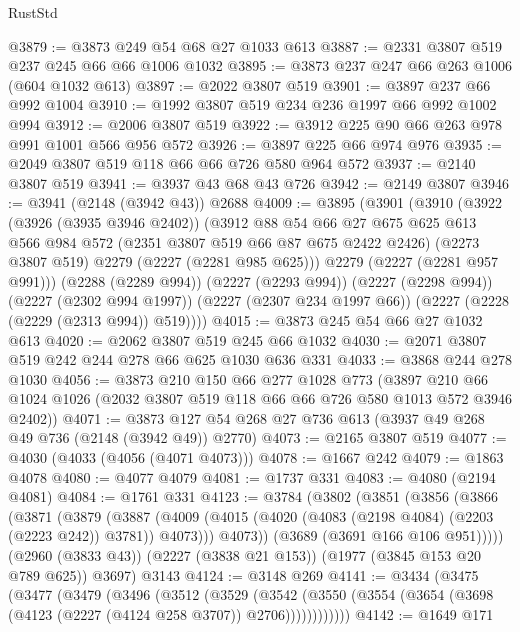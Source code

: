 \begin{lexlean}{RustStd}
\begin{coremodule}
@3879 := @3873 @249 @54 @68 @27 @1033 @613
@3887 := @2331 @3807 @519 @237 @245 @66 @66 @1006 @1032
@3895 := @3873 @237 @247 @66 @263 @1006 (@604 @1032 @613)
@3897 := @2022 @3807 @519
@3901 := @3897 @237 @66 @992 @1004
@3910 := @1992 @3807 @519 @234 @236 @1997 @66 @992 @1002 @994
@3912 := @2006 @3807 @519
@3922 := @3912 @225 @90 @66 @263 @978 @991 @1001 @566 @956 @572
@3926 := @3897 @225 @66 @974 @976
@3935 := @2049 @3807 @519 @118 @66 @66 @726 @580 @964 @572
@3937 := @2140 @3807 @519
@3941 := @3937 @43 @68 @43 @726
@3942 := @2149 @3807
@3946 := @3941 (@2148 (@3942 @43)) @2688
@4009 := @3895
    (@3901
      (@3910
        (@3922
          (@3926 (@3935 @3946 @2402))
          (@3912
            @88
            @54
            @66
            @27
            @675
            @625
            @613
            @566
            @984
            @572
            (@2351 @3807 @519 @66 @87 @675 @2422 @2426)
            (@2273 @3807 @519)
            @2279
            (@2227 (@2281 @985 @625)))
          @2279
          (@2227 (@2281 @957 @991)))
        (@2288 (@2289 @994))
        (@2227 (@2293 @994))
        (@2227 (@2298 @994))
        (@2227 (@2302 @994 @1997))
        (@2227 (@2307 @234 @1997 @66))
        (@2227 (@2228 (@2229 (@2313 @994)) @519))))
@4015 := @3873 @245 @54 @66 @27 @1032 @613
@4020 := @2062 @3807 @519 @245 @66 @1032
@4030 := @2071 @3807 @519 @242 @244 @278 @66 @625 @1030 @636 @331
@4033 := @3868 @244 @278 @1030
@4056 := @3873
    @210
    @150
    @66
    @277
    @1028
    @773
    (@3897 @210 @66 @1024 @1026 (@2032 @3807 @519 @118 @66 @66 @726 @580 @1013 @572 @3946 @2402))
@4071 := @3873 @127 @54 @268 @27 @736 @613 (@3937 @49 @268 @49 @736 (@2148 (@3942 @49)) @2770)
@4073 := @2165 @3807 @519
@4077 := @4030 (@4033 (@4056 (@4071 @4073)))
@4078 := @1667 @242
@4079 := @1863 @4078
@4080 := @4077 @4079
@4081 := @1737 @331
@4083 := @4080 (@2194 @4081)
@4084 := @1761 @331
@4123 := @3784
    (@3802
      (@3851
        (@3856
          (@3866
            (@3871
              (@3879
                (@3887
                  (@4009 (@4015 (@4020 (@4083 (@2198 @4084) (@2203 (@2223 @242)) @3781)) @4073)))
                @4073))
            (@3689 (@3691 @166 @106 @951)))))
      (@2960 (@3833 @43))
      (@2227 (@3838 @21 @153))
      (@1977 (@3845 @153 @20 @789 @625))
      @3697)
    @3143
@4124 := @3148 @269
@4141 := @3434
    (@3475
      (@3477
        (@3479
          (@3496
            (@3512
              (@3529
                (@3542
                  (@3550 (@3554 (@3654 (@3698 (@4123 (@2227 (@4124 @258 @3707)) @2706))))))))))))
@4142 := @1649 @171

\end{coremodule}
\end{lexlean}
